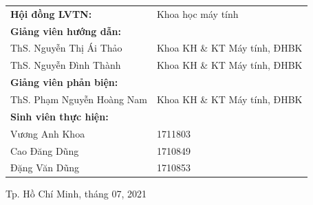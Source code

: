 \begin{titlepage}
    \begin{center}
        \def\arraystretch{1.5}
        \begin{tabular}{ll}
            \textbf{Hội đồng LVTN:} & Khoa học máy tính \\
            \textbf{Giảng viên hướng dẫn:} & \\
            \hspace{0.5cm} ThS. Nguyễn Thị Ái Thảo & Khoa KH \& KT Máy tính, ĐHBK \\
            \hspace{0.5cm} ThS. Nguyễn Đình Thành & Khoa KH \& KT Máy tính, ĐHBK \\
            \textbf{Giảng viên phản biện:} & \\
            \hspace{0.5cm} ThS. Phạm Nguyễn Hoàng Nam & Khoa KH \& KT Máy tính, ĐHBK \\
            \textbf{Sinh viên thực hiện:} & \\
            \hspace{0.5cm} Vương Anh Khoa & 1711803 \\
            \hspace{0.5cm} Cao Đăng Dũng & 1710849 \\
            \hspace{0.5cm} Đặng Văn Dũng & 1710853 \\
        \end{tabular}
        \vspace{1cm}
    \end{center}
    
    \begin{center}
        Tp. Hồ Chí Minh, tháng 07, 2021
    \end{center}
    
\end{titlepage}
